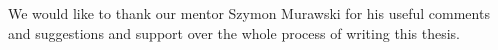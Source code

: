 \documentclass[
    11pt,
    english, %
    singlespacing, %
    headsepline, %
    oneside, %
]{MastersDoctoralThesis} %
\begin{document}

    \begin{acknowledgements}
        \addchaptertocentry{\acknowledgementname} %
        We would like to thank our mentor Szymon Murawski for his useful comments and suggestions and support
        over the whole process of writing this thesis.
    \end{acknowledgements}


    \tableofcontents %
%
%

\end{document}
